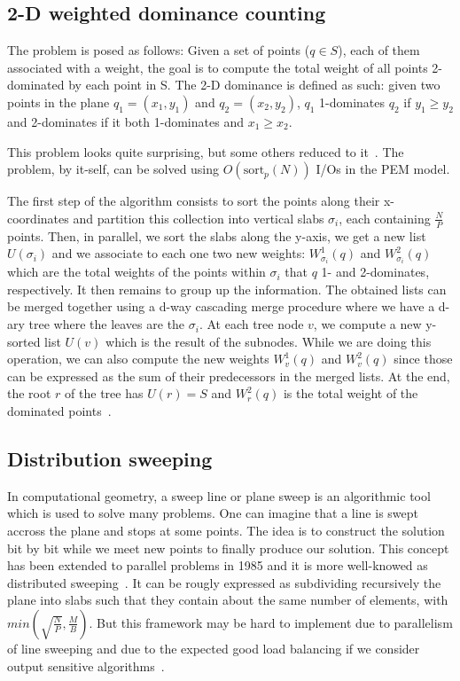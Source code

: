 \subsection{2-D weighted dominance counting}

The problem is posed as follows: Given a set of points ($q \in S$), each of them associated with a weight, the goal is to compute the total weight of all points 2-dominated by each point in S. The 2-D dominance is defined as such: given two points in the plane $q_{1} = (x_{1}, y_{1})$ and $q_{2} = (x_{2}, y_{2})$, $q_{1}$ 1-dominates $q_{2}$ if $y_{1} \geq y_{2}$ and 2-dominates if it both 1-dominates and $x_{1} \geq x_{2}$.

This problem looks quite surprising, but some others reduced to it~\cite{atallah1986sweeping}. The problem, by it-self, can be solved using $O(\text{sort}_{p} (N))$ I/Os in the PEM model.

The first step of the algorithm consists to sort the points along their x-coordinates and partition this collection into vertical slabs $\sigma_{i}$, each containing $\frac{N}{P}$ points. Then, in parallel, we sort the slabs along the y-axis, we get a new list $U(\sigma_{i})$ and we associate to each one two new weights: $W^{1}_{\sigma_{i}}(q)$ and $W^{2}_{\sigma_{i}}(q)$ which are the total weights of the points within $\sigma_{i}$ that $q$ 1- and 2-dominates, respectively.
It then remains to group up the information. The obtained lists can be merged together using a d-way cascading merge procedure where we have a d-ary tree where the leaves are the $\sigma_{i}$. At each tree node $v$, we compute a new y-sorted list $U(v)$ which is the result of the subnodes. While we are doing this operation, we can also compute the new weights $W^{1}_{v}(q)$ and $W^{2}_{v}(q)$ since those can be expressed as the sum of their predecessors in the merged lists. At the end, the root $r$ of the tree has $U(r) = S$ and $W^{2}_{r}(q)$ is the total weight of the dominated points~\cite{ajwani2010geometric}.

\subsection{Distribution sweeping}

In computational geometry, a sweep line or plane sweep is an algorithmic tool which is used to solve many problems. One can imagine that a line is swept accross the plane and stops at some points. The idea is to construct the solution bit by bit while we meet new points to finally produce our solution. This concept has been extended to parallel problems in 1985 and it is more well-knowed as distributed sweeping~\cite{atallah1986sweeping}. It can be rougly expressed as subdividing recursively the plane into slabs such that they contain about the same number of elements, with $min(\sqrt{\frac{N}{P}}, \frac{M}{B})$. But this framework may be hard to implement due to parallelism of line sweeping and due to the expected good load balancing if we consider output sensitive algorithms~\cite{ajwani2013empirical}.

